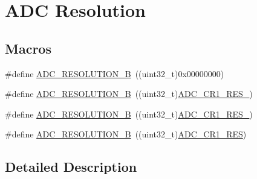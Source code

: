 \hypertarget{group___a_d_c___resolution}{\section{A\-D\-C Resolution}
\label{group___a_d_c___resolution}
}
\subsection*{Macros}
\begin{DoxyCompactItemize}
\item 
\#define \hyperlink{group___a_d_c___resolution_ga49c8408a1cdbf97bbf29234c3770fa74}{A\-D\-C\-\_\-\-R\-E\-S\-O\-L\-U\-T\-I\-O\-N\-\_\-B}~((uint32\-\_\-t)0x00000000)
\item 
\#define \hyperlink{group___a_d_c___resolution_ga91289e269eb3080d25301909c0f417e5}{A\-D\-C\-\_\-\-R\-E\-S\-O\-L\-U\-T\-I\-O\-N\-\_\-B}~((uint32\-\_\-t)\hyperlink{group___peripheral___registers___bits___definition_gacfc432ddbd2140a92d877f6d9dc52417}{A\-D\-C\-\_\-\-C\-R1\-\_\-\-R\-E\-S\-\_})
\item 
\#define \hyperlink{group___a_d_c___resolution_ga39925af93719877bdcc5664e4b95e69a}{A\-D\-C\-\_\-\-R\-E\-S\-O\-L\-U\-T\-I\-O\-N\-\_\-B}~((uint32\-\_\-t)\hyperlink{group___peripheral___registers___bits___definition_ga674904864f540043692a5b5ead9fae10}{A\-D\-C\-\_\-\-C\-R1\-\_\-\-R\-E\-S\-\_})
\item 
\#define \hyperlink{group___a_d_c___resolution_ga24c5226e05db78b4065f2f187d497b04}{A\-D\-C\-\_\-\-R\-E\-S\-O\-L\-U\-T\-I\-O\-N\-\_\-B}~((uint32\-\_\-t)\hyperlink{group___peripheral___registers___bits___definition_ga71e4a4c233895a2e7b6dd3ca6ca849e5}{A\-D\-C\-\_\-\-C\-R1\-\_\-\-R\-E\-S})
\end{DoxyCompactItemize}


\subsection{Detailed Description}


